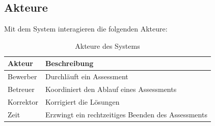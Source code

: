 \subsection{Akteure}

Mit dem System interagieren die folgenden Akteure:

\begin{table}[H]
    \begin{tabular}{|l|l|}
        \hline
        \rowcolor{PrimaryColor!50} Akteur & Beschreibung                                       \\
        \hline
        Bewerber                          & Durchläuft ein Assessment                          \\
        \hline
        Betreuer                          & Koordiniert den Ablauf eines Assessments           \\
        \hline
        Korrektor                         & Korrigiert die Lösungen                            \\
        \hline
        Zeit                              & Erzwingt ein rechtzeitiges Beenden des Assessments \\
        \hline
    \end{tabular}
    \caption{\label{tab:participants} Akteure des Systems}
\end{table}
